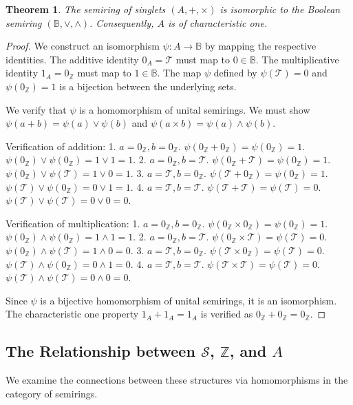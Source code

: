 \documentclass[11pt, a4paper]{article}
\theoremstyle{plain}
\newtheorem{theorem}{Theorem}[section]
\theoremstyle{definition}
\numberwithin{equation}{section}
\newcommand{\Z}{\mathbb{Z}}
\newcommand{\Tobj}{\mathcal{T}} %
\newcommand{\SemiringS}{\mathcal{S}}
\newcommand{\Bool}{\mathbb{B}}
\begin{document}
\begin{theorem}\label{thm:A_isomorphic_to_Boolean}
The semiring of singlets $(A, +, \times)$ is isomorphic to the Boolean semiring $(\Bool, \lor, \wedge)$. Consequently, $A$ is of characteristic one.
\end{theorem}
\begin{proof}
We construct an isomorphism $\psi: A \to \Bool$ by mapping the respective identities.
The additive identity $0_A=\Tobj$ must map to $0 \in \Bool$. The multiplicative identity $1_A=0_{\Z}$ must map to $1 \in \Bool$.
The map $\psi$ defined by $\psi(\Tobj) = 0$ and $\psi(0_{\Z}) = 1$ is a bijection between the underlying sets.

We verify that $\psi$ is a homomorphism of unital semirings. We must show $\psi(a+b) = \psi(a)\lor\psi(b)$ and $\psi(a\times b) = \psi(a)\wedge\psi(b)$.

Verification of addition:
1. $a=0_{\Z}, b=0_{\Z}$. $\psi(0_{\Z}+0_{\Z}) = \psi(0_{\Z}) = 1$. $\psi(0_{\Z})\lor\psi(0_{\Z}) = 1\lor 1 = 1$.
2. $a=0_{\Z}, b=\Tobj$. $\psi(0_{\Z}+\Tobj) = \psi(0_{\Z}) = 1$. $\psi(0_{\Z})\lor\psi(\Tobj) = 1\lor 0 = 1$.
3. $a=\Tobj, b=0_{\Z}$. $\psi(\Tobj+0_{\Z}) = \psi(0_{\Z}) = 1$. $\psi(\Tobj)\lor\psi(0_{\Z}) = 0\lor 1 = 1$.
4. $a=\Tobj, b=\Tobj$. $\psi(\Tobj+\Tobj) = \psi(\Tobj) = 0$. $\psi(\Tobj)\lor\psi(\Tobj) = 0\lor 0 = 0$.

Verification of multiplication:
1. $a=0_{\Z}, b=0_{\Z}$. $\psi(0_{\Z}\times 0_{\Z}) = \psi(0_{\Z}) = 1$. $\psi(0_{\Z})\wedge\psi(0_{\Z}) = 1\wedge 1 = 1$.
2. $a=0_{\Z}, b=\Tobj$. $\psi(0_{\Z}\times\Tobj) = \psi(\Tobj) = 0$. $\psi(0_{\Z})\wedge\psi(\Tobj) = 1\wedge 0 = 0$.
3. $a=\Tobj, b=0_{\Z}$. $\psi(\Tobj\times 0_{\Z}) = \psi(\Tobj) = 0$. $\psi(\Tobj)\wedge\psi(0_{\Z}) = 0\wedge 1 = 0$.
4. $a=\Tobj, b=\Tobj$. $\psi(\Tobj\times\Tobj) = \psi(\Tobj) = 0$. $\psi(\Tobj)\wedge\psi(\Tobj) = 0\wedge 0 = 0$.

Since $\psi$ is a bijective homomorphism of unital semirings, it is an isomorphism.
The characteristic one property $1_A+1_A=1_A$ is verified as $0_{\Z}+0_{\Z}=0_{\Z}$.
\end{proof}

\subsection{The Relationship between \texorpdfstring{$\SemiringS$}{S}, \texorpdfstring{$\Z$}{Z}, and \texorpdfstring{$A$}{A}}

We examine the connections between these structures via homomorphisms in the category of semirings.
\end{document}
